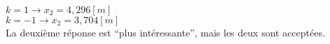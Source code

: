 %
%
\\
    \(k=1 \rightarrow x_2=4,296[m]\)\\
    \(k=-1 \rightarrow x_2=3,704[m]\)\\
    La deuxième réponse est \enquote{plus intéressante}, mais les deux sont acceptées.
